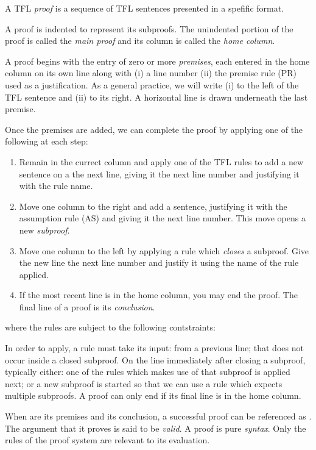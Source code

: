 \begin{definition}[Proof]
  A TFL \emph{proof} is a sequence of TFL sentences presented in a spefific
  format.

  A proof is indented to represent its subproofs. The unindented portion of the
  proof is called the \emph{main proof} and its column is called the \emph{home
  column}.

  A proof begins with the entry of zero or more \emph{premises}, each entered
  in the home column on its own line along with (i) a line number (ii) the
  premise rule (PR) used as a justification. As a general practice, we will
  write (i) to the left of the TFL sentence and (ii) to its right. A horizontal
  line is drawn underneath the last premise.

  Once the premises are added, we can complete the proof by applying one of the
  following at each step:

  \begin{enumerate}
  \item Remain in the currect column and apply one of the TFL rules to add a new
    sentence on a the next line, giving it the next line number and justifying
    it with the rule name.
  \item Move one column to the right and add a sentence, justifying it with the
    assumption rule (AS) and giving it the next line number. This move opens a
    new \emph{subproof}.
  \item Move one column to the left by applying a rule which \emph{closes} a
    subproof. Give the new line the next line number and justify it using the
    name of the rule applied.
  \item If the most recent line is in the home column, you may end the proof.
    The final line of a proof is its \emph{conclusion}. 
  \end{enumerate}

  where the rules are subject to the following contstraints:

  \begin{outline}[enumerate]
  \1 In order to apply, a rule must take its input:
  \2 from a previous line;
  \2 that does not occur inside a closed subproof.
  \1 On the line immediately after closing a subproof, typically either:
  \2 one of the rules which makes use of that subproof is applied next; or
  \2 a new subproof is started so that we can use a rule which expects multiple
  subproofs. 
  \1 A proof can only end if its final line is in the home column. 
  \end{outline}

  When \eGamma are its premises and \ephi its conclusion, a successful proof
  can be referenced as \eGamma\eproves\ephi. The argument that it proves is
  said to be \emph{valid}. A proof is pure \emph{syntax}. Only the rules of the
  proof system are relevant to its evaluation.
\end{definition}

